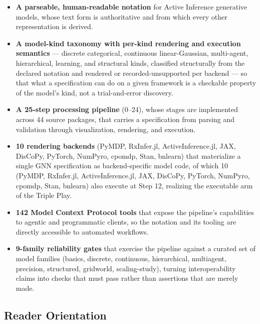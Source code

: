 \documentclass[
  english,
  9pt,
]{extarticle}
\providecommand{\tightlist}{%
  \setlength{\itemsep}{0pt}\setlength{\parskip}{0pt}}
\begin{document}
\begin{itemize}
\tightlist
\item
  \textbf{A parseable, human-readable notation} for Active Inference
  generative models, whose text form is authoritative and from which
  every other representation is derived.
\item
  \textbf{A model-kind taxonomy with per-kind rendering and execution
  semantics} --- discrete categorical, continuous linear-Gaussian,
  multi-agent, hierarchical, learning, and structural kinds, classified
  structurally from the declared notation and rendered or
  recorded-unsupported per backend --- so that what a specification can
  do on a given framework is a checkable property of the model's kind,
  not a trial-and-error discovery.
\item
  \textbf{A 25-step processing pipeline} (0--24), whose stages are
  implemented across 44 source packages, that carries a specification
  from parsing and validation through visualization, rendering, and
  execution.
\item
  \textbf{10 rendering backends} (PyMDP, RxInfer.jl, ActiveInference.jl,
  JAX, DisCoPy, PyTorch, NumPyro, cpomdp, Stan, bnlearn) that
  materialize a single GNN specification as backend-specific model code,
  of which 10 (PyMDP, RxInfer.jl, ActiveInference.jl, JAX, DisCoPy,
  PyTorch, NumPyro, cpomdp, Stan, bnlearn) also execute at Step 12,
  realizing the executable arm of the Triple Play.
\item
  \textbf{142 Model Context Protocol tools} that expose the pipeline's
  capabilities to agentic and programmatic clients, so the notation and
  its tooling are directly accessible to automated workflows.
\item
  \textbf{9-family reliability gates} that exercise the pipeline against
  a curated set of model families (basics, discrete, continuous,
  hierarchical, multiagent, precision, structured, gridworld,
  scaling-study), turning interoperability claims into checks that must
  pass rather than assertions that are merely made.
\end{itemize}

\subsection{Reader Orientation}\label{reader-orientation}
\end{document}
